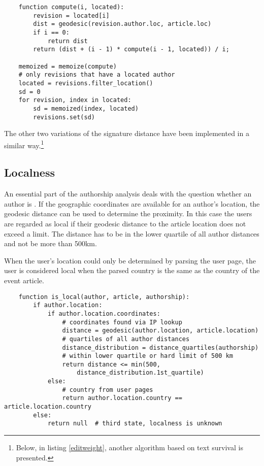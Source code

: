 \begin{lstlisting}
	function compute(i, located):
		revision = located[i]
		dist = geodesic(revision.author.loc, article.loc)
		if i == 0:
			return dist
		return (dist + (i - 1) * compute(i - 1, located)) / i;
		
	memoized = memoize(compute)
	# only revisions that have a located author
	located = revisions.filter_location() 
	sd = 0
	for revision, index in located:
		sd = memoized(index, located)
		revisions.set(sd)
\end{lstlisting}

The other two variations of the signature distance have been implemented in a similar way.\footnote{Below, in listing \ref{editweight}, another algorithm based on text survival is presented.}

\subsection{Localness}\label{sub:localness}

An essential part of the authorship analysis deals with the question whether an author is .
If the geographic coordinates are available for an author's location, the geodesic distance can be used to determine the proximity. 
In this case the users are regarded as local if their geodesic distance to the article location does not exceed a limit.
The distance has to be in the lower quartile of all author distances and not be more than 500km.

When the user's location could only be determined by parsing the user page, the user is considered local when the parsed country is the same as the country of the event article.



\begin{lstlisting}
	function is_local(author, article, authorship):
		if author.location:
			if author.location.coordinates:
				# coordinates found via IP lookup
				distance = geodesic(author.location, article.location)
				# quartiles of all author distances
				distance_distribution = distance_quartiles(authorship) 
				# within lower quartile or hard limit of 500 km
				return distance <= min(500, 
					distance_distribution.1st_quartile)
			else: 
				# country from user pages
				return author.location.country == article.location.country
		else:
			return null	 # third state, localness is unknown
\end{lstlisting}

